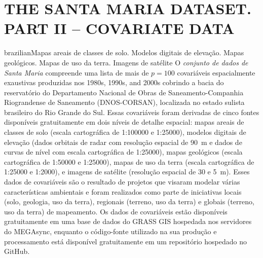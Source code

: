 \artigotrue
\chapter{THE SANTA MARIA DATASET. PART II -- COVARIATE DATA}
\label{chap:chap05}



\def\ptkeys{Mapas areais de classes de solo. Modelos digitais de elevação. Mapas geológicos. Mapas de uso da 
terra. Imagens de satélite}
\begin{chapterabstract}{brazilian}{\ptkeys}
O \emph{conjunto de dados de Santa Maria} compreende uma lista de mais de $p = 100$ covariáveis espacialmente 
exaustivas produzidas nos 1980s, 1990s, and 2000s cobrindo a bacia do reservatório do Departamento Nacional de 
Obras de Saneamento-Companhia Riograndense de Saneamento (DNOS-CORSAN), localizada no estado sulista 
brasileiro do Rio Grande do Sul. Essas covariáveis foram derivadas de cinco fontes disponíveis gratuitamente 
em dois níveis de detalhe espacial: mapas areais de classes de solo (escala cartográfica de 1:\num{100000} e 
1:\num{25000}), modelos digitais de elevação (dados orbitais de radar com resolução espacial de \SI{90}{\m} e 
dados de curvas de nível com escala cartográfica de 1:\num{25000}), mapas geológicos (escala cartográfica de 
1:\num{50000} e 1:\num{25000}), mapas de uso da terra (escala cartográfica de 1:\num{25000} e 1:\num{2000}), e 
imagens de satélite (resolução espacial de 30 e \SI{5}{\m}). Esses dados de covariáveis são o resultado de 
projetos que visaram modelar várias características ambientais e foram realizados como parte de iniciativas 
locais (solo, geologia, uso da terra), regionais (terreno, uso da terra) e globais (terreno, uso da terra) de 
mapeamento. Os dados de covariáveis estão disponíveis gratuitamente em uma base de dados do GRASS GIS 
hospedada nos servidores do MEGAsync, enquanto o código-fonte utilizado na sua produção e processamento está 
disponível gratuitamente em um repositório hospedado no GitHub.
\end{chapterabstract}

